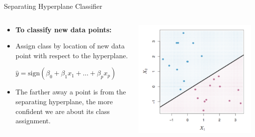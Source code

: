 \begin{frame}{Separating Hyperplane Classifier}
\begin{columns}
  \begin{column}{0.5\textwidth}
    \begin{itemize}
      \item \textbf{To classify new data points:}
      \item Assign class by location of new data point with respect to the hyperplane.
    \end{itemize}

    \[
      \hat{y} = \text{sign}(\beta_0 + \beta_1 x_1 + \ldots + \beta_p x_p)
    \]

    \begin{itemize}
      \item The farther away a point is from the separating hyperplane, the more confident we are about its class assignment.
    \end{itemize}
  \end{column}

  \begin{column}{0.5\textwidth}
    \centering
    \includegraphics[width=\linewidth]{images/support-vector-machines/support-vector-machines-6.png}
  \end{column}
\end{columns}
\end{frame}


